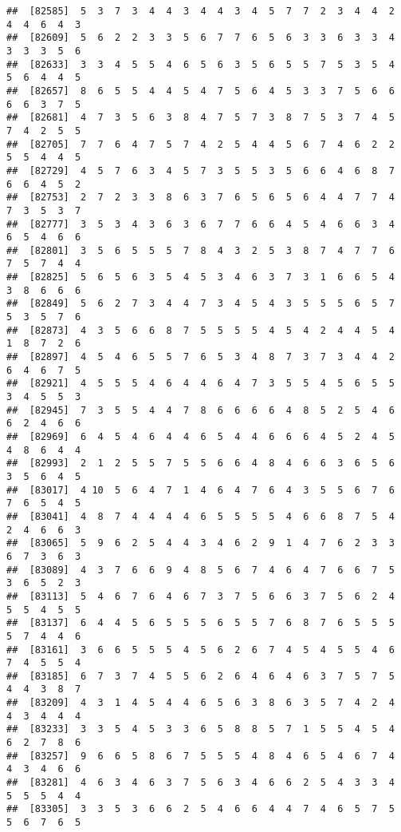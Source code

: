 \documentclass[
]{book}
\begin{document}
\begin{verbatim}
##  [82585]  5  3  7  3  4  4  3  4  4  3  4  5  7  7  2  3  4  4  2  4  4  6  4  3
##  [82609]  5  6  2  2  3  3  5  6  7  7  6  5  6  3  3  6  3  3  4  3  3  3  5  6
##  [82633]  3  3  4  5  5  4  6  5  6  3  5  6  5  5  7  5  3  5  4  5  6  4  4  5
##  [82657]  8  6  5  5  4  4  5  4  7  5  6  4  5  3  3  7  5  6  6  6  6  3  7  5
##  [82681]  4  7  3  5  6  3  8  4  7  5  7  3  8  7  5  3  7  4  5  7  4  2  5  5
##  [82705]  7  7  6  4  7  5  7  4  2  5  4  4  5  6  7  4  6  2  2  5  5  4  4  5
##  [82729]  4  5  7  6  3  4  5  7  3  5  5  3  5  6  6  4  6  8  7  6  6  4  5  2
##  [82753]  2  7  2  3  3  8  6  3  7  6  5  6  5  6  4  4  7  7  4  7  3  5  3  7
##  [82777]  3  5  3  4  3  6  3  6  7  7  6  6  4  5  4  6  6  3  4  6  5  4  6  6
##  [82801]  3  5  6  5  5  5  7  8  4  3  2  5  3  8  7  4  7  7  6  7  5  7  4  4
##  [82825]  5  6  5  6  3  5  4  5  3  4  6  3  7  3  1  6  6  5  4  3  8  6  6  6
##  [82849]  5  6  2  7  3  4  4  7  3  4  5  4  3  5  5  5  6  5  7  5  3  5  7  6
##  [82873]  4  3  5  6  6  8  7  5  5  5  5  4  5  4  2  4  4  5  4  1  8  7  2  6
##  [82897]  4  5  4  6  5  5  7  6  5  3  4  8  7  3  7  3  4  4  2  6  4  6  7  5
##  [82921]  4  5  5  5  4  6  4  4  6  4  7  3  5  5  4  5  6  5  5  3  4  5  5  3
##  [82945]  7  3  5  5  4  4  7  8  6  6  6  6  4  8  5  2  5  4  6  6  2  4  6  6
##  [82969]  6  4  5  4  6  4  4  6  5  4  4  6  6  6  4  5  2  4  5  4  8  6  4  4
##  [82993]  2  1  2  5  5  7  5  5  6  6  4  8  4  6  6  3  6  5  6  3  5  6  4  5
##  [83017]  4 10  5  6  4  7  1  4  6  4  7  6  4  3  5  5  6  7  6  7  6  5  4  5
##  [83041]  4  8  7  4  4  4  4  6  5  5  5  5  4  6  6  8  7  5  4  2  4  6  6  3
##  [83065]  5  9  6  2  5  4  4  3  4  6  2  9  1  4  7  6  2  3  3  6  7  3  6  3
##  [83089]  4  3  7  6  6  9  4  8  5  6  7  4  6  4  7  6  6  7  5  3  6  5  2  3
##  [83113]  5  4  6  7  6  4  6  7  3  7  5  6  6  3  7  5  6  2  4  5  5  4  5  5
##  [83137]  6  4  4  5  6  5  5  5  6  5  5  7  6  8  7  6  5  5  5  5  7  4  4  6
##  [83161]  3  6  6  5  5  5  4  5  6  2  6  7  4  5  4  5  5  4  6  7  4  5  5  4
##  [83185]  6  7  3  7  4  5  5  6  2  6  4  6  4  6  3  7  5  7  5  4  4  3  8  7
##  [83209]  4  3  1  4  5  4  4  6  5  6  3  8  6  3  5  7  4  2  4  4  3  4  4  4
##  [83233]  3  3  5  4  5  3  3  6  5  8  8  5  7  1  5  5  4  5  4  6  2  7  8  6
##  [83257]  9  6  6  5  8  6  7  5  5  5  4  8  4  6  5  4  6  7  4  4  3  4  6  6
##  [83281]  4  6  3  4  6  3  7  5  6  3  4  6  6  2  5  4  3  3  4  5  5  5  4  4
##  [83305]  3  3  5  3  6  6  2  5  4  6  6  4  4  7  4  6  5  7  5  5  6  7  6  5

\end{verbatim}
\end{document}
